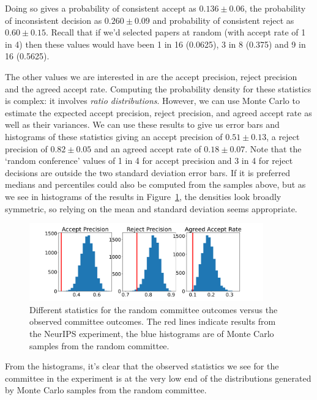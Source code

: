 Doing so gives a probability of consistent accept as \(0.136 \pm 0.06\), the
probability of inconsistent decision as \(0.260 \pm 0.09\) and
probability of consistent reject as \(0.60 \pm 0.15\). Recall that if
we'd selected papers at random (with accept rate of 1 in 4) then these
values would have been 1 in 16 (0.0625), 3 in 8 (0.375) and 9 in 16
(0.5625).

The other values we are interested in are the accept precision, reject
precision and the agreed accept rate. Computing the probability density
for these statistics is complex: it involves \emph{ratio
distributions}. However, we can use Monte Carlo to estimate the expected
accept precision, reject precision, and agreed accept rate as well as
their variances. We can use these results to give us error bars and
histograms of these statistics giving an accept precision of \(0.51 \pm 0.13\), a reject precision of
\(0.82 \pm 0.05\) and an agreed accept rate of \(0.18 \pm 0.07\). Note
that the `random conference' values of 1 in 4 for accept precision and 3
in 4 for reject decisions are outside the two standard deviation error
bars. If it is preferred medians and percentiles could also be computed
from the samples above, but as we see in histograms  of the results in Figure~\ref{random-committee-outcomes},
the densities look broadly symmetric, so relying on the mean and standard deviation seems appropriate.

\begin{figure}[htb]
\centering
\includegraphics[width=0.90\textwidth]{diagrams/neurips/random-committee-outcomes-vs-true.pdf}


\caption{Different statistics for the random committee outcomes versus the observed committee outcomes. The red lines indicate results from the NeurIPS experiment, the blue histograms are of Monte Carlo samples from the random committee.}
\label{random-committee-outcomes}
\end{figure}

From the histograms, it's clear that the observed statistics we see for the committee in the experiment is at the very low end of the distributions generated by Monte Carlo samples from the random committee.

